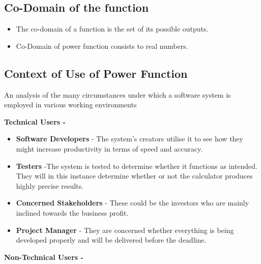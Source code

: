 \documentclass[a4paper,12pt]{article}
\begin{document}
\subsection{Co-Domain of the function}
\begin{itemize}

    \item The co-domain of a function is the set of its possible outputs.
    
    \item Co-Domain of power function consists to real numbers.
        
\end{itemize}



\subsection{Context of Use of Power Function}

\item An analysis of the many circumstances under which a software system is employed in various working environments

\space
\begin{enumerate*}
    \item \large \textbf{Technical Users - }
\end{enumerate*}
\space
\begin{itemize}
    \item \textbf{Software Developers} - The system's creators utilise it to see how they might increase productivity in terms of speed and accuracy.

    \item \textbf{Testers} -The system is tested to determine whether it functions as intended. They will in this instance determine whether or not the calculator produces highly precise results.

    \item \textbf{Concerned Stakeholders} - These could be the investors who are mainly inclined towards the business profit.
    
    \item \textbf{Project Manager} - They are concerned whether everything is being developed properly and will be delivered before the deadline.
\end{itemize}

\begin{enumerate*}
    \item \large \textbf{Non-Technical Users - }
\end{enumerate*}
\end{document}
